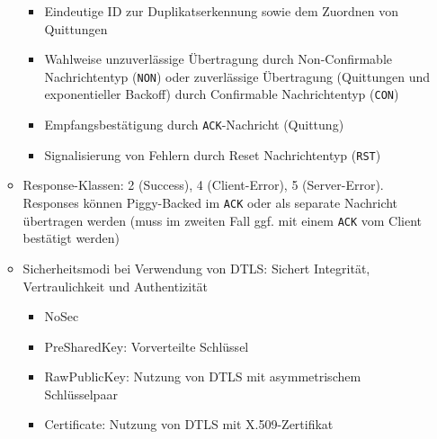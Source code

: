 \begin{itemize}
\begin{itemize}
		\begin{itemize}
			\item Eindeutige ID zur Duplikatserkennung sowie dem Zuordnen von Quittungen
			\item Wahlweise unzuverlässige Übertragung durch Non-Confirmable Nachrichtentyp (\texttt{NON}) oder zuverlässige Übertragung (Quittungen und exponentieller Backoff) durch Confirmable Nachrichtentyp (\texttt{CON})
			\item Empfangsbestätigung durch \texttt{ACK}-Nachricht (Quittung)
			\item Signalisierung von Fehlern durch Reset Nachrichtentyp (\texttt{RST})
		\end{itemize}
		\item Response-Klassen: 2 (Success), 4 (Client-Error), 5 (Server-Error). Responses können Piggy-Backed im \texttt{ACK} oder als separate Nachricht übertragen werden (muss im zweiten Fall ggf. mit einem \texttt{ACK} vom Client bestätigt werden)
		\item Sicherheitsmodi bei Verwendung von DTLS: Sichert Integrität, Vertraulichkeit und Authentizität
		\begin{itemize}
			\item NoSec
			\item PreSharedKey: Vorverteilte Schlüssel
			\item RawPublicKey: Nutzung von DTLS mit asymmetrischem Schlüsselpaar
			\item Certificate: Nutzung von DTLS mit X.509-Zertifikat
		\end{itemize}
	\end{itemize}
\end{itemize}

